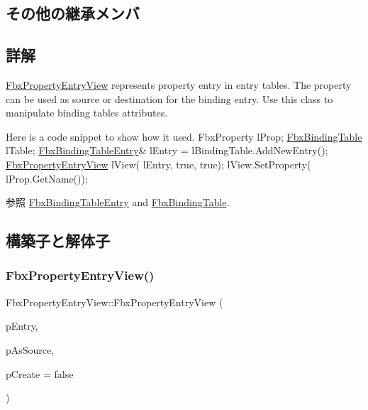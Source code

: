 \subsection*{その他の継承メンバ}


\subsection{詳解}
\hyperlink{class_fbx_property_entry_view}{Fbx\+Property\+Entry\+View} represents property entry in entry tables. The property can be used as source or destination for the binding entry. Use this class to manipulate binding table\textquotesingle{}s attributes.


\begin{DoxyCode}
 Here is a code snippet to show how it used.
FbxProperty lProp;
\hyperlink{class_fbx_binding_table}{FbxBindingTable} lTable;
\hyperlink{class_fbx_binding_table_entry}{FbxBindingTableEntry}& lEntry = lBindingTable.AddNewEntry();
\hyperlink{class_fbx_property_entry_view}{FbxPropertyEntryView} lView( lEntry, \textcolor{keyword}{true}, \textcolor{keyword}{true});
lView.SetProperty( lProp.GetName());
\end{DoxyCode}


\begin{DoxySeeAlso}{参照}
\hyperlink{class_fbx_binding_table_entry}{Fbx\+Binding\+Table\+Entry} and \hyperlink{class_fbx_binding_table}{Fbx\+Binding\+Table}. 
\end{DoxySeeAlso}


\subsection{構築子と解体子}
\mbox{\label{class_fbx_property_entry_view_ac1d9bbc86521ef0f3d8a1761568bc19c}} 
\subsubsection{\texorpdfstring{Fbx\+Property\+Entry\+View()}{FbxPropertyEntryView()}}
{\footnotesize\ttfamily Fbx\+Property\+Entry\+View\+::\+Fbx\+Property\+Entry\+View (\begin{DoxyParamCaption}\item[{\hyperlink{class_fbx_binding_table_entry}{Fbx\+Binding\+Table\+Entry} $\ast$}]{p\+Entry,  }\item[{bool}]{p\+As\+Source,  }\item[{bool}]{p\+Create = {\ttfamily false} }\end{DoxyParamCaption})}

